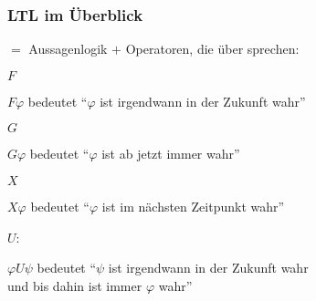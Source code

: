     \begin{frame}
      \frametitle{LTL im Überblick}
       $=$ Aussagenlogik $+$ Operatoren, die über  sprechen:


      \par\smallskip
      \begin{Itemize}
        \item[$F$]
          \par\smallskip
          $F\varphi$ bedeutet "`$\varphi$ ist irgendwann in der Zukunft wahr"'
          \par\medskip
        \item[$G$]
          \par\smallskip
          $G\varphi$ bedeutet "`$\varphi$ ist ab jetzt immer wahr"'
          \par\medskip
        \item[$X$]
          \par\smallskip          
          $X\varphi$ bedeutet "`$\varphi$ ist im nächsten Zeitpunkt wahr"'
          \par\medskip
        \item[$U$:]
          \par\smallskip          
          $\varphi U\psi$ bedeutet "`$\psi$ ist irgendwann in der Zukunft wahr\\
          \hspace*{25mm} und bis dahin ist immer $\varphi$ wahr"'
      \end{Itemize}

%       

    \end{frame}

